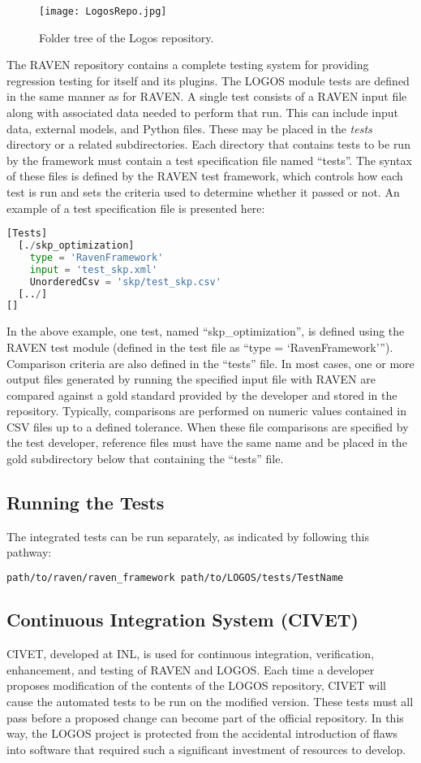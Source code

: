 \begin{figure}
    \centering
    \centerline{\texttt{[image: LogosRepo.jpg]}}
    \caption{Folder tree of the Logos repository.}
    \label{fig:Logos}
\end{figure}

The RAVEN repository contains a complete testing system for providing regression
testing for itself and its plugins. The LOGOS module tests are defined in the
same manner as for RAVEN. A single test consists of a RAVEN input file
along with associated data needed to perform that run. This can include input data,
external models, and Python files. These may be placed in the \textit{tests} directory
or a related subdirectories. Each directory that contains tests to be run by
the framework must contain a test specification file named “tests”. The syntax of
these files is defined by the RAVEN test framework, which controls how each test
is run and sets the criteria used to determine whether it passed or not. An example
of a test specification file is presented here:
\begin{lstlisting}[language=python]
[Tests]
  [./skp_optimization]
    type = 'RavenFramework'
    input = 'test_skp.xml'
    UnorderedCsv = 'skp/test_skp.csv'
  [../]
[]
\end{lstlisting}
In the above example, one test, named ``skp\_optimization'', is defined using the RAVEN
test module (defined in the test file as “type = `RavenFramework'”). Comparison
criteria are also defined in the “tests” file. In most cases, one or more output
files generated by running the specified input file with RAVEN are compared
against a gold standard provided by the developer and stored in the repository.
Typically, comparisons are performed on numeric values contained in
CSV files up to a defined tolerance. When these file comparisons are specified
by the test developer, reference files must have the same name and be placed
in the gold subdirectory below that containing the “tests” file.

\subsection{Running the Tests}
The integrated tests can be run separately, as indicated by following this pathway:
\begin{lstlisting}[language=bash]
path/to/raven/raven_framework path/to/LOGOS/tests/TestName
\end{lstlisting}

\subsection{Continuous Integration System (CIVET)}
CIVET, developed at INL, is used for continuous integration, verification,
enhancement, and testing of RAVEN and LOGOS. Each time a developer
proposes modification of the contents of the LOGOS repository, CIVET will cause
the automated tests to be run on the modified version. These tests must all pass
before a proposed change can become part of the official repository. In this way,
the LOGOS project is protected from the accidental introduction of flaws into
software that required such a significant investment of resources to develop.

